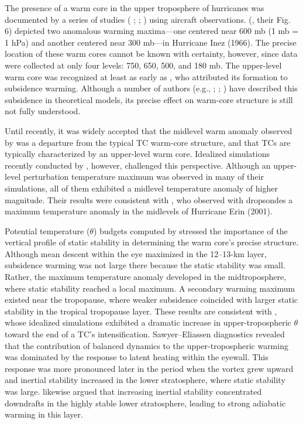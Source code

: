 The presence of a warm core in the upper troposphere of hurricanes was documented by a series of studies (\citeauthor{LaSeurHawkins1963} \citeyear{LaSeurHawkins1963}; \citeauthor{HawkinsRubsam1968} \citeyear{HawkinsRubsam1968}; \citeauthor{HawkinsImbembo1976} \citeyear{HawkinsImbembo1976}) using aircraft observations.
\citeauthor{HawkinsImbembo1976} (\citeyear{HawkinsImbembo1976}, their Fig. 6) depicted two anomalous warming maxima---one centered near 600 mb (1 mb = 1 hPa) and another centered near 300 mb---in Hurricane Inez (1966).
The precise location of these warm cores cannot be known with certainty, however, since data were collected at only four levels: 750, 650, 500, and 180 mb.
The upper-level warm core was recognized at least as early as \cite{Haurwitz1935}, who attributed its formation to subsidence warming.
Although a number of authors (e.g., \citeauthor{Malkus1958} \citeyear{Malkus1958}; \citeauthor{Willoughby1979} \citeyear{Willoughby1979}; \citeauthor{Smith1980} \citeyear{Smith1980}) have described this subsidence in theoretical models, its precise effect on warm-core structure is still not fully understood.

Until recently, it was widely accepted that the midlevel warm anomaly observed by \cite{HawkinsImbembo1976} was a departure from the typical TC warm-core structure, and that TCs are typically characterized by an upper-level warm core.
Idealized simulations recently conducted by \cite{SternNolan2012}, however, challenged this perspective.
Although an upper-level perturbation temperature maximum was observed in many of their simulations, all of them exhibited a midlevel temperature anomaly of higher magnitude.
Their results were consistent with \cite{Halversonetal2006}, who observed with dropsondes a maximum temperature anomaly in the midlevels of Hurricane Erin (2001).

Potential temperature ($\theta$) budgets computed by \cite{SternZhang2013} stressed the importance of the vertical profile of static stability in determining the warm core’s precise structure.
Although mean descent within the eye maximized in the 12--13-km layer, subsidence warming was not large there because the static stability was small.
Rather, the maximum temperature anomaly developed in the midtroposphere, where static stability reached a local maximum.
A secondary warming maximum existed near the tropopause, where weaker subsidence coincided with larger static stability in the tropical tropopause layer.
These results are consistent with \cite{OhnoSatoh2015}, whose idealized simulations exhibited a dramatic increase in upper-tropospheric $\theta$ toward the end of a TC’s intensification.
Sawyer--Eliassen diagnostics \cite{PendergrassWilloughby2009} revealed that the contribution of balanced dynamics to the upper-tropospheric warming was dominated by the response to latent heating within the eyewall.
This response was more pronounced later in the period when the vortex grew upward and inertial stability increased in the lower stratosphere, where static stability was large.
\cite{ZhangChen2012} likewise argued that increasing inertial stability concentrated downdrafts in the highly stable lower stratosphere, leading to strong adiabatic warming in this layer.

